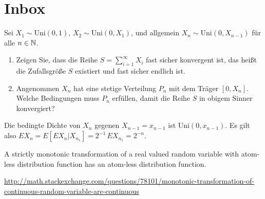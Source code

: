 
\section{Inbox}


 Sei $X_{1} \sim \text{Uni}(0,1)$,
$X_2 \sim \text{Uni}(0,X_1)$, und allgemein $X_{n} \sim \text{Uni}(0,X_{n-1})$ für alle
$n \in \mathbb N$. 
\begin{enumerate}
    \item Zeigen Sie, dass die Reihe $S=\sum_{i=1}^{\infty} X_i$ fast sicher konvergent ist, das heißt
        die Zufallsgröße $S$ existiert und fast sicher endlich ist.
    \item Angenommen $X_n$ hat eine stetige Verteilung $P_n$ mit dem Träger $[0,X_n]$. Welche 
        Bedingungen muss $P_n$ erfüllen, damit die Reihe $S$ in obigem Sinner konvergiert?
\end{enumerate}

\solution Die bedingte Dichte von $X_n$ gegenen $X_{n-1} = x_{n-1}$ ist
$\text{Uni}(0,x_{n-1})$.  Es gilt also $E X_{n} = E \left[ E X_{n} | X_{n_1}
\right] = 2^{-1} \, E X_{n_1} = 2^{-n}$.



 A strictly monotonic
transformation of a real valued random variable with atom-less distribution
function has an atom-less distribution function. 

\url{http://math.stackexchange.com/questions/78101/monotonic-transformation-of-continuous-random-variable-are-continuous}


